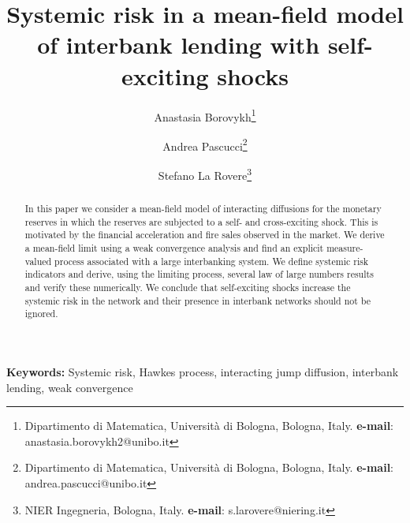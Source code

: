 \documentclass[10pt]{article}
\theoremstyle{plain}
\theoremstyle{definition}
\newcommand{\<}{\langle}
\renewcommand{\>}{\rangle}
\renewcommand{\(}{\left(}
\renewcommand{\)}{\right)}
\renewcommand{\[}{\left[}
\renewcommand{\]}{\right]}
\providecommand{\keywords}[1]{\textbf{Keywords:} #1}
\begin{document}
\title{Systemic risk in a mean-field model of interbank lending with self-exciting shocks}

\author{Anastasia Borovykh\thanks{Dipartimento di Matematica, Universit\`a di Bologna, Bologna, Italy.
\textbf{e-mail}: anastasia.borovykh2@unibo.it} \and Andrea Pascucci\thanks{Dipartimento di Matematica, Universit\`a di
Bologna, Bologna, Italy. \textbf{e-mail}: andrea.pascucci@unibo.it}
\and Stefano La Rovere\thanks{NIER Ingegneria, Bologna, Italy. \textbf{e-mail}: s.larovere@niering.it}}

\maketitle

\begin{abstract}
In this paper we consider a mean-field model of interacting diffusions for the monetary reserves in which the reserves are subjected to a self- and cross-exciting shock. This is motivated by the financial acceleration and fire sales observed in the market. We derive a mean-field limit using a weak convergence analysis and find an explicit measure-valued process associated with a large interbanking system. We define systemic risk indicators and derive, using the limiting process, several law of large numbers results and verify these numerically. We conclude that self-exciting shocks increase the systemic risk in the network and their presence in interbank networks should not be ignored.
\end{abstract}
\keywords{Systemic risk, Hawkes process, interacting jump diffusion, interbank lending, weak convergence}
\end{document}
